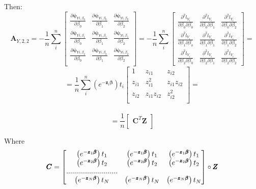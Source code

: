 \documentclass[]{article}
\begin{document}
Then:
  \[
  \pmb{A}_{Y,2,2} = -\frac{1}{n}\sum_i^n\begin{bmatrix}
      \frac{\partial \pmb{\psi}_{Yi,\beta_0}}{ \partial \beta_0} &
      \frac{\partial \pmb{\psi}_{Yi,\beta_0}}{ \partial \beta_1} &
      \frac{\partial \pmb{\psi}_{Yi,\beta_0}}{ \partial \beta_2} \\
      \frac{\partial \pmb{\psi}_{Yi,\beta_1}}{ \partial \beta_0} &
      \frac{\partial \pmb{\psi}_{Yi,\beta_1}}{ \partial \beta_1} &
      \frac{\partial \pmb{\psi}_{Yi,\beta_1}}{ \partial \beta_2} \\
      \frac{\partial \pmb{\psi}_{Yi,\beta_2}}{ \partial \beta_0} &
      \frac{\partial \pmb{\psi}_{Yi,\beta_2}}{ \partial \beta_1} &
      \frac{\partial \pmb{\psi}_{Yi,\beta_2}}{ \partial \beta_2}\\
  \end{bmatrix}
   =-\frac{1}{n}\sum_i^n\begin{bmatrix}
      \frac{\partial^2 l_{Y_i}}{ \partial \beta_0\partial \beta_0}  & \frac{\partial^2 l_{Y_i}}{ \partial \beta_0\partial \beta_1} & \frac{\partial^2 l_{Y_i}}{ \partial \beta_0\partial \beta_2} \\
      \frac{\partial^2 l_{Y_i}}{ \partial \beta_1\partial \beta_o}  & \frac{\partial^2 l_{Y_i}}{ \partial \beta_1\partial \beta_1} & \frac{\partial^2 l_{Y_i}}{ \partial \beta_1\partial \beta_2}\\
      \frac{\partial^2 l_{Y_i}}{ \partial \beta_2\partial \beta_0}  & \frac{\partial^2 l_{Y_i}}{ \partial \beta_2\partial \beta_1} & \frac{\partial^2 l_{Y_i}}{ \partial \beta_2\partial \beta_2}
  \end{bmatrix} =
  \]
  \[
    =\frac{1}{n}\sum_i^n  \left(e^{-\pmb{z}_i \pmb{\beta}}\right)t_i
  \begin{bmatrix}
      1   &  z_{i1}   & z_{i2}   \\
      z_{i1}   &  z_{i1}^2   & z_{i1}z_{i2} \\
      z_{i2}   &  z_{i1}z_{i2}   & z_{i2}^2  \\
  \end{bmatrix}=\]\\
  \[
  =\frac{1}{n}
  \begin{bmatrix}
      \pmb{C}^T\pmb{Z} \\
  \end{bmatrix} 
  \]
  
  Where
  \[
  \pmb{C} = 
  \begin{bmatrix}
      \left(e^{-\pmb{z}_1 \pmb{\beta}}\right)t_1   &  \left(e^{-\pmb{z}_1 \pmb{\beta}}\right)t_1  & \left(e^{-\pmb{z}_1 \pmb{\beta}}\right)t_1 \\
      \left(e^{-\pmb{z}_2 \pmb{\beta}}\right)t_2   &  \left(e^{-\pmb{z}_2 \pmb{\beta}}\right)t_2  & \left(e^{-\pmb{z}_2 \pmb{\beta}}\right)t_2 \\
       .......................... \\
      \left(e^{-\pmb{z}_N \pmb{\beta}}\right)t_N   &  \left(e^{-\pmb{z}_N \pmb{\beta}}\right)t_N  & \left(e^{-\pmb{z}_N \pmb{\beta}}\right)t_N \\
  \end{bmatrix} 
    \circ \pmb{Z} \\
  \]
\end{document}
